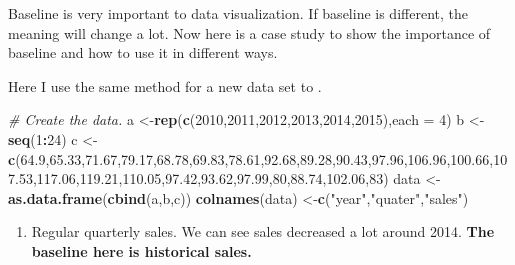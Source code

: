 \documentclass[]{book}
\newenvironment{Shaded}{\begin{snugshade}}{\end{snugshade}}
\newcommand{\KeywordTok}[1]{\textcolor[rgb]{0.13,0.29,0.53}{\textbf{#1}}}
\newcommand{\DataTypeTok}[1]{\textcolor[rgb]{0.13,0.29,0.53}{#1}}
\newcommand{\DecValTok}[1]{\textcolor[rgb]{0.00,0.00,0.81}{#1}}
\newcommand{\FloatTok}[1]{\textcolor[rgb]{0.00,0.00,0.81}{#1}}
\newcommand{\StringTok}[1]{\textcolor[rgb]{0.31,0.60,0.02}{#1}}
\newcommand{\CommentTok}[1]{\textcolor[rgb]{0.56,0.35,0.01}{\textit{#1}}}
\newcommand{\OperatorTok}[1]{\textcolor[rgb]{0.81,0.36,0.00}{\textbf{#1}}}
\newcommand{\NormalTok}[1]{#1}
\providecommand{\tightlist}{%
  \setlength{\itemsep}{0pt}\setlength{\parskip}{0pt}}
\theoremstyle{definition}
\theoremstyle{definition}
\theoremstyle{definition}
\theoremstyle{remark}
\begin{document}
Baseline is very important to data visualization. If baseline is
different, the meaning will change a lot. Now here is a case study to
show the importance of baseline and how to use it in different ways.

Here I use the same method for a new data set to .

\begin{Shaded}
\begin{Highlighting}[]
\CommentTok{# Create the data.}
\NormalTok{a <-}\KeywordTok{rep}\NormalTok{(}\KeywordTok{c}\NormalTok{(}\DecValTok{2010}\NormalTok{,}\DecValTok{2011}\NormalTok{,}\DecValTok{2012}\NormalTok{,}\DecValTok{2013}\NormalTok{,}\DecValTok{2014}\NormalTok{,}\DecValTok{2015}\NormalTok{),}\DataTypeTok{each =} \DecValTok{4}\NormalTok{)}
\NormalTok{b <-}\StringTok{ }\KeywordTok{seq}\NormalTok{(}\DecValTok{1}\OperatorTok{:}\DecValTok{24}\NormalTok{)}
\NormalTok{c <-}\StringTok{ }\KeywordTok{c}\NormalTok{(}\FloatTok{64.9}\NormalTok{,}\FloatTok{65.33}\NormalTok{,}\FloatTok{71.67}\NormalTok{,}\FloatTok{79.17}\NormalTok{,}\FloatTok{68.78}\NormalTok{,}\FloatTok{69.83}\NormalTok{,}\FloatTok{78.61}\NormalTok{,}\FloatTok{92.68}\NormalTok{,}\FloatTok{89.28}\NormalTok{,}\FloatTok{90.43}\NormalTok{,}\FloatTok{97.96}\NormalTok{,}\FloatTok{106.96}\NormalTok{,}\FloatTok{100.66}\NormalTok{,}\FloatTok{107.53}\NormalTok{,}\FloatTok{117.06}\NormalTok{,}\FloatTok{119.21}\NormalTok{,}\FloatTok{110.05}\NormalTok{,}\FloatTok{97.42}\NormalTok{,}\FloatTok{93.62}\NormalTok{,}\FloatTok{97.99}\NormalTok{,}\DecValTok{80}\NormalTok{,}\FloatTok{88.74}\NormalTok{,}\FloatTok{102.06}\NormalTok{,}\DecValTok{83}\NormalTok{)}
\NormalTok{data <-}\StringTok{ }\KeywordTok{as.data.frame}\NormalTok{(}\KeywordTok{cbind}\NormalTok{(a,b,c))}
\KeywordTok{colnames}\NormalTok{(data) <-}\KeywordTok{c}\NormalTok{(}\StringTok{"year"}\NormalTok{,}\StringTok{"quater"}\NormalTok{,}\StringTok{"sales"}\NormalTok{)}
\end{Highlighting}
\end{Shaded}

\begin{enumerate}
\def\labelenumi{\arabic{enumi}.}
\tightlist
\item
  Regular quarterly sales. We can see sales decreased a lot around 2014.
  \textbf{The baseline here is historical sales.}
\end{enumerate}

\begin{Shaded}
\end{Shaded}
\end{document}
